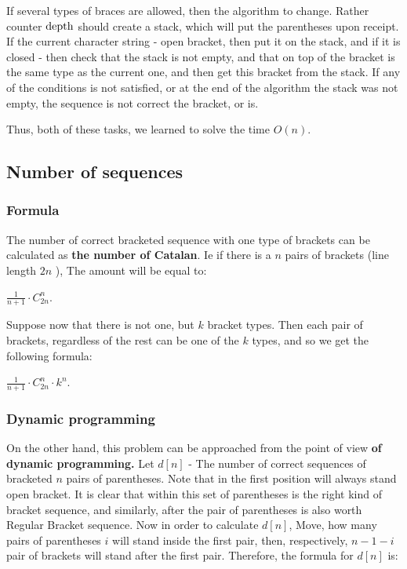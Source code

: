If several types of braces are allowed, then the algorithm to change. Rather counter $\rm depth$ should create a stack, which will put the parentheses upon receipt. If the current character string - open bracket, then put it on the stack, and if it is closed - then check that the stack is not empty, and that on top of the bracket is the same type as the current one, and then get this bracket from the stack. If any of the conditions is not satisfied, or at the end of the algorithm the stack was not empty, the sequence is not correct the bracket, or is.

Thus, both of these tasks, we learned to solve the time $O (n)$.

\subsection{ Number of sequences }

\subsubsection{ Formula }

The number of correct bracketed sequence with one type of brackets can be calculated as \textbf{the number of Catalan}. Ie if there is a $n$ pairs of brackets (line length $2n$ ), The amount will be equal to:

$\frac {1} {n +1} \cdot C ^ n_ {2n}.$

Suppose now that there is not one, but $k$ bracket types. Then each pair of brackets, regardless of the rest can be one of the $k$ types, and so we get the following formula:

$\frac {1} {n +1} \cdot C ^ n_ {2n} \cdot k ^ n.$

\subsubsection{ Dynamic programming }

On the other hand, this problem can be approached from the point of view \textbf{of dynamic programming.} Let $d [n]$ - The number of correct sequences of bracketed $n$ pairs of parentheses. Note that in the first position will always stand open bracket. It is clear that within this set of parentheses is the right kind of bracket sequence, and similarly, after the pair of parentheses is also worth Regular Bracket sequence. Now in order to calculate $d [n]$, Move, how many pairs of parentheses $i$ will stand inside the first pair, then, respectively, $n-1-i$ pair of brackets will stand after the first pair. Therefore, the formula for $d [n]$ is:


